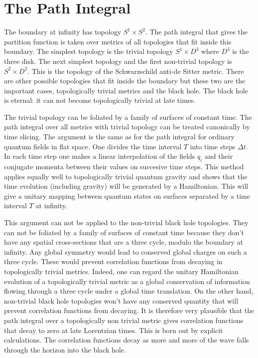 \documentclass[aps,prd,groupedaddress,showpacs]{revtex4}
\begin{document}
\section{ The Path Integral }

The boundary at infinity has topology $S^1 \times S^2$. The path integral that gives the partition function is taken over metrics of all topologies that fit inside this boundary. The simplest topology is the trivial topology $S^1 \times D^3$ where $D^3$ is the three disk. The next simplest topology and the first non-trivial topology is $S^2 \times D^2$. This is the topology of the Schwarzschild anti-de Sitter metric. There are other possible topologies that fit inside the boundary but these two are the important cases, topologically trivial metrics and the black hole. The black hole is eternal: it can not become topologically trivial at late times.

The trivial topology can be foliated by a family of surfaces of constant time. The path integral over all metrics with trivial topology can be treated canonically by time slicing. The argument is the same as for the path integral for ordinary quantum fields in flat space. One divides the time interval $T$ into time steps $\Delta t$. In each time step one makes a linear interpolation of the fields $q_i$ and their conjugate momenta between their values on succesive time steps. This method applies equally well to topologically trivial quantum gravity and shows that the time evolution (including gravity) will be generated by 
a Hamiltonian. This will give a unitary mapping between quantum states on surfaces separated by a time interval $T$ at infinity. 

This argument can not be applied to the non-trivial black hole topologies. They can not be foliated by a family of surfaces of constant time because they don't have any spatial cross-sections that are a three cycle, modulo the boundary at infinity. Any global symmetry would lead to conserved global charges on such a three cycle. These would prevent correlation functions from decaying in topologically trivial metrics. Indeed, one can regard the unitary Hamiltonian evolution of a topologically trivial metric as a global conservation of information flowing through a three cycle under a global time translation. On the other hand, non-trivial black hole topologies won't have any conserved quantity that will prevent correlation functions from decaying. It is therefore very plausible that the path integral over a topologically non trivial metric gives correlation functions that decay to zero at late Lorentzian times. This is  born out by explicit calculations. The correlation functions decay as more and more of the wave falls through the horizon into the black hole.   
\end{document}
